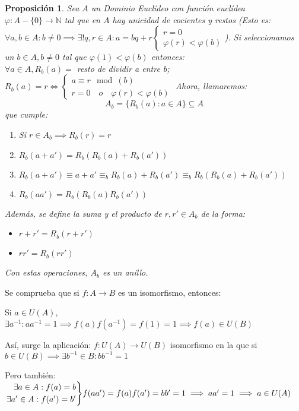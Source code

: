 \documentclass[11pt, a4paper, titlepage]{article}
\makeatletter
\renewenvironment{proof}[1][\proofname] {\vspace{-15pt}\par\pushQED{\qed}\normalfont\topsep6\p@\@plus6\p@\relax\trivlist\item[\hskip\labelsep\it#1\@addpunct{.}]\ignorespaces}{\popQED\endtrivlist\@endpefalse}
\providecommand{\nat}{\mathbb{N}}
\theoremstyle{theorem-style}
\newtheorem*{nprop}{Proposición}
\theoremstyle{definition-style}
\theoremstyle{remark-style}
\theoremstyle{example-style}
\newenvironment{rcases}
  {\left.\begin{aligned}}
  {\end{aligned}\right\rbrace}
\makeatother
\begin{document}
\begin{nprop}
	Sea $A$ un Dominio Euclídeo con función euclídea $\varphi :A-\{0\} \to \nat$ tal que en $A$ hay unicidad de cocientes y restos (Esto es: $\forall a,b \in A: b\ne 0 \implies \exists ! q,r\in A : a=bq+r \begin{cases}
	r = 0 \\
	\varphi(r) < \varphi(b)
\end{cases}$). Si seleccionamos un $b \in A, b \ne 0$ tal que $\varphi(1) < \varphi(b)$ entonces:\\
$\forall a \in A, R_b(a)=$ resto de dividir a entre b; $R_b(a) = r \iff \begin{cases}
	a \equiv r \mod(b)\\
	r = 0 \quad o \quad \varphi(r) < \varphi(b)
\end{cases}$
Ahora, llamaremos: $$ A_b = \{ R_b(a): a \in A\} \subseteq A$$ que cumple:

\begin{enumerate}
	\item Si $r\in A_b \implies R_b(r) = r$
	\item $R_b(a+a') = R_b(R_b(a) + R_b(a'))$\\
	\begin{proof}
	$R_b(a+a') \equiv a+a' \equiv_b R_b(a) +R_b(a') \equiv_b R_b(R_b(a) + R_b(a'))$
\end{proof}
	\item $R_b(aa') = R_b(R_b(a)R_b(a'))$
\end{enumerate}

Además, se define la suma y el producto de $r,r' \in A_b$ de la forma:
\begin{itemize}
	\item $r+r' = R_b(r+r')$
	\item $rr' = R_b(rr')$
\end{itemize}

Con estas operaciones, $A_b$ es un anillo.
\end{nprop}


Se comprueba que si $f: A \to B$ es un isomorfismo, entonces:

Si $a \in U(A)$,$\exists a^{-1}: aa^{-1} = 1\implies f(a)f(a^{-1}) = f(1) = 1 \implies f(a) \in U(B)$

Así, surge la aplicación: $f: U(A) \to U(B)$ isomorfismo en la que si $b\in U(B) \implies \exists b^{-1} \in B : bb^{-1} = 1$


Pero también:\\
 $\begin{rcases}
	\exists a \in A: f(a) = b\\
	\exists a' \in A: f(a') = b'
\end{rcases} f(aa') = f(a)f(a') =bb' = 1 \implies aa' = 1 \implies a \in U(A)$
\end{document}
